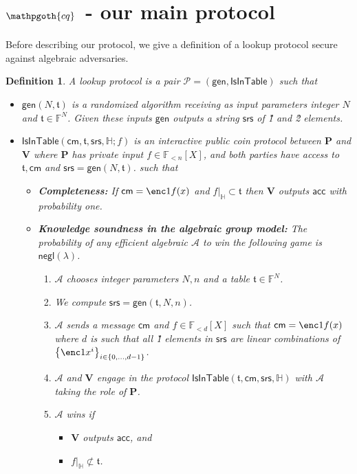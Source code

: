 \documentclass[11pt]{article} %
\newcommand{\cq}{\ensuremath{\mathpgoth{cq} }\xspace}
\newcommand{\F}{\ensuremath{\mathbb F}\xspace}
\newcommand{\adv}{\ensuremath{\mathcal A}\xspace}
\newcommand{\srs}{\ensuremath{\mathsf{srs}}\xspace}
\newcommand{\cm}{\ensuremath{\mathsf{cm}}\xspace}
\newcommand{\negl}{\ensuremath{\mathsf{negl}(\lambda)}\xspace}
\newcommand{\acc}{\ensuremath{\mathsf{acc}}\xspace}
\newcommand{\sett}[2]{\ensuremath{\set{#1}_{#2}}\xspace}
\newcommand{\gen}{\ensuremath{\mathsf{gen}}\xspace}
\newcommand{\prv}{\ensuremath{\mathsf{\mathbf{P}}}\xspace}
\newcommand{\ver}{\ensuremath{\mathsf{\mathbf{V}}}\xspace}
\newcommand{\set}[1]{\ensuremath{\left\{#1\right\}}\xspace}
\newcommand{\polysofdeg}[1]{\ensuremath{\F_{< #1}[X]}\xspace}
\newcommand{\prot}{\ensuremath{\mathscr{P}}\xspace}
\newtheorem{dfn}[lemma]{Definition}
\newcommand{\restricttoset}[2]{\ensuremath{#1|_{#2}}\xspace}
\newcommand{\isintable}{\ensuremath{\mathsf{IsInTable}}\xspace}
\newcommand{\subspace}{\ensuremath{\mathbb{H}}\xspace}
\newcommand{\witsize}{\ensuremath{n}\xspace}
\newcommand{\tabsize}{\ensuremath{N}\xspace}
\newcommand{\tab}{\ensuremath{\mathfrak{t}}\xspace}
\begin{document}
\section{$\cq\;$ - our main protocol}
Before describing our protocol, we give a definition of a lookup protocol secure against algebraic adversaries.
\begin{dfn}\label{dfn:lookupprot}
A \emph{lookup protocol} is a pair $\prot=(\gen,\isintable)$ such that
\begin{itemize}
 \item $\gen(\tabsize,\tab)$ is a randomized algorithm receiving as input parameters integer $\tabsize$ and $\tab\in \F^\tabsize$. 
 Given these inputs \gen outputs a string \srs of \G1 and \G2 elements.
 \item $\isintable(\cm,\tab,\srs,\subspace;f)$ is an interactive public coin protocol between \prv and \ver where \prv has private input $f\in \polysofdeg{\witsize}$, and both parties have access to $\tab,\cm$ and  $\srs=\gen(\tabsize,\tab)$.
 such that
 \begin{itemize}
  \item \textbf{Completeness:} If $\cm=\enc1{f(x)}$ and $\restricttoset{f}{\subspace}\subset \tab$ then \ver outputs \acc with probability one.
  \item \textbf{Knowledge soundness in the algebraic group model:}
    The probability of any efficient algebraic \adv to win the following game is \negl.

\begin{enumerate}
\item \adv chooses integer parameters $\tabsize,\witsize$ and a table $\tab\in \F^\tabsize$.
 \item We compute $\srs=\gen(\tab,\tabsize,\witsize)$.
 \item \adv sends a message \cm and $f\in\polysofdeg{d}$ such that $\cm=\enc1{f(x)}$ where $d$ is such that all \G1 elements in \srs are linear
 combinations of \sett{\enc1{x^i}}{i\in \set{0,\ldots,d-1}}.
 \item \adv and \ver engage in the protocol $\isintable(\tab,\cm,\srs,\subspace)$ with \adv taking the role of \prv.
 \item \adv wins if 
 \begin{itemize}
  \item \ver outputs \acc, and
  \item $\restricttoset{f}{\subspace}\not\subset \tab$.
 \end{itemize}

\end{enumerate}
\end{itemize}
\end{itemize}
\end{dfn}
\end{document}

